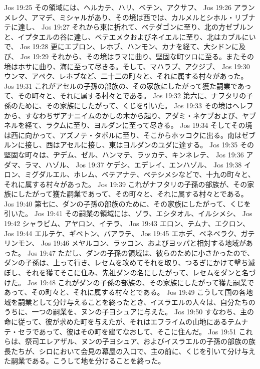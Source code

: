Jos 19:25  その領域には、ヘルカテ、ハリ、ベテン、アクサフ、
Jos 19:26  アランメレク、アマデ、ミシャルがあり、その境は西では、カルメルとシホル・リブナテに達し、
Jos 19:27  それから東に折れて、ベテダゴンに至り、北の方ゼブルンと、イプタエルの谷に達し、ベテエメクおよびネイエルに至り、北はカブルにいで、
Jos 19:28  更にエブロン、レホブ、ハンモン、カナを経て、大シドンに及び、
Jos 19:29  それから、その境はラマに曲り、堅固な町ツロに至る。またその境はホサに曲り、海に至って尽きる。そして、マハラブ、アクジブ、
Jos 19:30  ウンマ、アペク、レホブなど、二十二の町々と、それに属する村々があった。
Jos 19:31  これがアセルの子孫の部族の、その家族にしたがって獲た嗣業であって、その町々と、それに属する村々とである。
Jos 19:32  第六に、ナフタリの子孫のために、その家族にしたがって、くじを引いた。
Jos 19:33  その境はヘレフから、すなわちザアナニイムのかしの木から起り、アダミ・ネケブおよび、ヤブネルを経て、ラクムに至り、ヨルダンに至って尽きる。
Jos 19:34  そしてその境は西に向かって、アズノテ・タボルに至り、そこからホッコクに出る。南はゼブルンに接し、西はアセルに接し、東はヨルダンのユダに達する。
Jos 19:35  その堅固な町々は、ヂデム、ゼル、ハンマテ、ラッカテ、キンネレテ、
Jos 19:36  アダマ、ラマ、ハゾル、
Jos 19:37  ケデシ、エデレイ、エンハゾル、
Jos 19:38  イロン、ミグダルエル、ホレム、ベテアナテ、ベテシメシなどで、十九の町々と、それに属する村々があった。
Jos 19:39  これがナフタリの子孫の部族が、その家族にしたがって獲た嗣業であって、その町々と、それに属する村々とである。
Jos 19:40  第七に、ダンの子孫の部族のために、その家族にしたがって、くじを引いた。
Jos 19:41  その嗣業の領域には、ゾラ、エシタオル、イルシメシ、
Jos 19:42  シャラビム、アヤロン、イテラ、
Jos 19:43  エロン、テムナ、エクロン、
Jos 19:44  エルテケ、ギベトン、バアラテ、
Jos 19:45  エホデ、ベネベラク、ガテリンモン、
Jos 19:46  メヤルコン、ラッコン、およびヨッパと相対する地域があった。
Jos 19:47  ただし、ダンの子孫の領域は、彼らのために小さかったので、ダンの子孫は、上って行き、レセムを攻めてそれを取り、つるぎにかけて撃ち滅ぼし、それを獲てそこに住み、先祖ダンの名にしたがって、レセムをダンと名づけた。
Jos 19:48  これがダンの子孫の部族の、その家族にしたがって獲た嗣業であって、その町々と、それに属する村々とである。
Jos 19:49  こうして国の各地域を嗣業として分け与えることを終ったとき、イスラエルの人々は、自分たちのうちに、一つの嗣業を、ヌンの子ヨシュアに与えた。
Jos 19:50  すなわち、主の命に従って、彼が求めた町を与えたが、それはエフライムの山地にあるテムナテ・セラであって、彼はその町を建てなおして、そこに住んだ。
Jos 19:51  これらは、祭司エレアザル、ヌンの子ヨシュア、およびイスラエルの子孫の部族の族長たちが、シロにおいて会見の幕屋の入口で、主の前に、くじを引いて分け与えた嗣業である。こうして地を分けることを終った。
